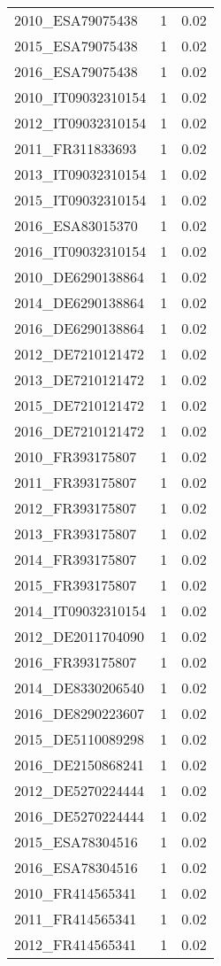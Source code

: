 \begin{table*}[htbp]
\begin{tabular}{lrr}
2010_ESA79075438 & 1 & 0.02 \\
2015_ESA79075438 & 1 & 0.02 \\
2016_ESA79075438 & 1 & 0.02 \\
2010_IT09032310154 & 1 & 0.02 \\
2012_IT09032310154 & 1 & 0.02 \\
2011_FR311833693 & 1 & 0.02 \\
2013_IT09032310154 & 1 & 0.02 \\
2015_IT09032310154 & 1 & 0.02 \\
2016_ESA83015370 & 1 & 0.02 \\
2016_IT09032310154 & 1 & 0.02 \\
2010_DE6290138864 & 1 & 0.02 \\
2014_DE6290138864 & 1 & 0.02 \\
2016_DE6290138864 & 1 & 0.02 \\
2012_DE7210121472 & 1 & 0.02 \\
2013_DE7210121472 & 1 & 0.02 \\
2015_DE7210121472 & 1 & 0.02 \\
2016_DE7210121472 & 1 & 0.02 \\
2010_FR393175807 & 1 & 0.02 \\
2011_FR393175807 & 1 & 0.02 \\
2012_FR393175807 & 1 & 0.02 \\
2013_FR393175807 & 1 & 0.02 \\
2014_FR393175807 & 1 & 0.02 \\
2015_FR393175807 & 1 & 0.02 \\
2014_IT09032310154 & 1 & 0.02 \\
2012_DE2011704090 & 1 & 0.02 \\
2016_FR393175807 & 1 & 0.02 \\
2014_DE8330206540 & 1 & 0.02 \\
2016_DE8290223607 & 1 & 0.02 \\
2015_DE5110089298 & 1 & 0.02 \\
2016_DE2150868241 & 1 & 0.02 \\
2012_DE5270224444 & 1 & 0.02 \\
2016_DE5270224444 & 1 & 0.02 \\
2015_ESA78304516 & 1 & 0.02 \\
2016_ESA78304516 & 1 & 0.02 \\
2010_FR414565341 & 1 & 0.02 \\
2011_FR414565341 & 1 & 0.02 \\
2012_FR414565341 & 1 & 0.02 \\

\end{tabular}
\end{table*}

